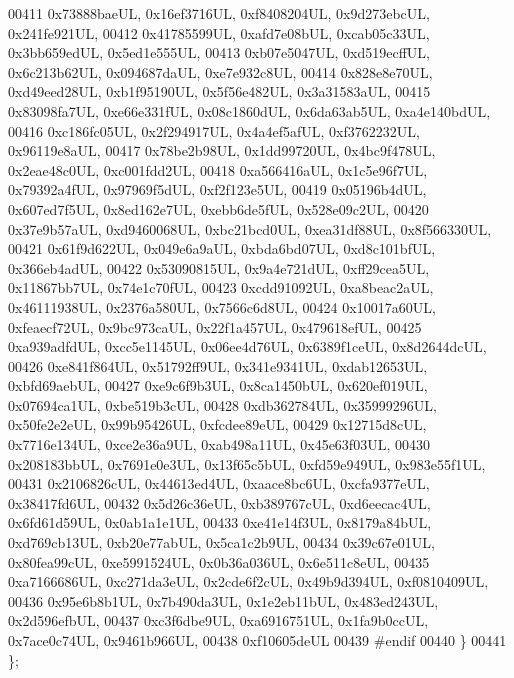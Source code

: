 \begin{DoxyCode}
00411     0x73888baeUL, 0x16ef3716UL, 0xf8408204UL, 0x9d273ebcUL, 0x241fe921UL,
00412     0x41785599UL, 0xafd7e08bUL, 0xcab05c33UL, 0x3bb659edUL, 0x5ed1e555UL,
00413     0xb07e5047UL, 0xd519ecffUL, 0x6c213b62UL, 0x094687daUL, 0xe7e932c8UL,
00414     0x828e8e70UL, 0xd49eed28UL, 0xb1f95190UL, 0x5f56e482UL, 0x3a31583aUL,
00415     0x83098fa7UL, 0xe66e331fUL, 0x08c1860dUL, 0x6da63ab5UL, 0xa4e140bdUL,
00416     0xc186fc05UL, 0x2f294917UL, 0x4a4ef5afUL, 0xf3762232UL, 0x96119e8aUL,
00417     0x78be2b98UL, 0x1dd99720UL, 0x4bc9f478UL, 0x2eae48c0UL, 0xc001fdd2UL,
00418     0xa566416aUL, 0x1c5e96f7UL, 0x79392a4fUL, 0x97969f5dUL, 0xf2f123e5UL,
00419     0x05196b4dUL, 0x607ed7f5UL, 0x8ed162e7UL, 0xebb6de5fUL, 0x528e09c2UL,
00420     0x37e9b57aUL, 0xd9460068UL, 0xbc21bcd0UL, 0xea31df88UL, 0x8f566330UL,
00421     0x61f9d622UL, 0x049e6a9aUL, 0xbda6bd07UL, 0xd8c101bfUL, 0x366eb4adUL,
00422     0x53090815UL, 0x9a4e721dUL, 0xff29cea5UL, 0x11867bb7UL, 0x74e1c70fUL,
00423     0xcdd91092UL, 0xa8beac2aUL, 0x46111938UL, 0x2376a580UL, 0x7566c6d8UL,
00424     0x10017a60UL, 0xfeaecf72UL, 0x9bc973caUL, 0x22f1a457UL, 0x479618efUL,
00425     0xa939adfdUL, 0xcc5e1145UL, 0x06ee4d76UL, 0x6389f1ceUL, 0x8d2644dcUL,
00426     0xe841f864UL, 0x51792ff9UL, 0x341e9341UL, 0xdab12653UL, 0xbfd69aebUL,
00427     0xe9c6f9b3UL, 0x8ca1450bUL, 0x620ef019UL, 0x07694ca1UL, 0xbe519b3cUL,
00428     0xdb362784UL, 0x35999296UL, 0x50fe2e2eUL, 0x99b95426UL, 0xfcdee89eUL,
00429     0x12715d8cUL, 0x7716e134UL, 0xce2e36a9UL, 0xab498a11UL, 0x45e63f03UL,
00430     0x208183bbUL, 0x7691e0e3UL, 0x13f65c5bUL, 0xfd59e949UL, 0x983e55f1UL,
00431     0x2106826cUL, 0x44613ed4UL, 0xaace8bc6UL, 0xcfa9377eUL, 0x38417fd6UL,
00432     0x5d26c36eUL, 0xb389767cUL, 0xd6eecac4UL, 0x6fd61d59UL, 0x0ab1a1e1UL,
00433     0xe41e14f3UL, 0x8179a84bUL, 0xd769cb13UL, 0xb20e77abUL, 0x5ca1c2b9UL,
00434     0x39c67e01UL, 0x80fea99cUL, 0xe5991524UL, 0x0b36a036UL, 0x6e511c8eUL,
00435     0xa7166686UL, 0xc271da3eUL, 0x2cde6f2cUL, 0x49b9d394UL, 0xf0810409UL,
00436     0x95e6b8b1UL, 0x7b490da3UL, 0x1e2eb11bUL, 0x483ed243UL, 0x2d596efbUL,
00437     0xc3f6dbe9UL, 0xa6916751UL, 0x1fa9b0ccUL, 0x7ace0c74UL, 0x9461b966UL,
00438     0xf10605deUL
00439 \textcolor{preprocessor}{#endif}
00440   \}
00441 \};
\end{DoxyCode}
